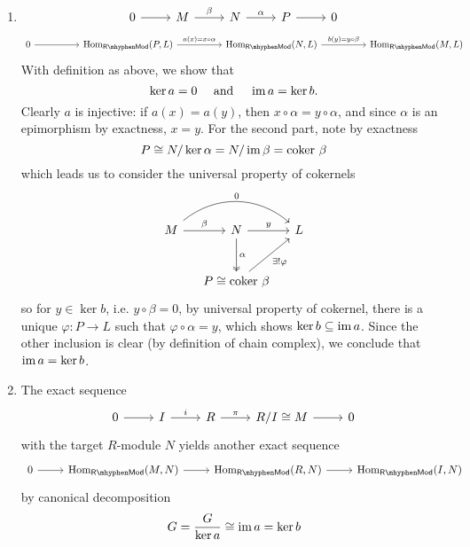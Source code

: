 \begin{pf}
\begin{enumerate}[label=(\roman*)]
    \setlength\itemsep{0pt}
    \item     
    \[
    \begin{tikzcd}
    0 \arrow[r] &M \arrow[r, "\beta"] &N \arrow[r, "\alpha"] &P \arrow[r] &0
    \end{tikzcd} 
    \]
    \[
    \begin{tikzcd}[column sep=huge]
    0 \arrow[r] &\Hom_\mathsf{R\mhyphen Mod}(P,L) \arrow[r, "a(x) = x \circ \alpha"] &\Hom_\mathsf{R\mhyphen Mod}(N,L) \arrow[r, "b(y) = y \circ \beta"] &\Hom_\mathsf{R\mhyphen Mod}(M,L)
    \end{tikzcd}	
    \]
    With definition as above, we show that 
    \[
    \ker a = 0 \quad \text{ and } \quad \operatorname{im} a = \ker b.
    \]
    Clearly $a$ is injective: if $a(x) = a(y)$, then $x \circ \alpha = y \circ \alpha$, and since $\alpha$ is an epimorphism by exactness, $x = y$. For the second part, note by exactness
    \[
    P \cong N/\ker\alpha = N/\operatorname{im}\beta = \text{coker }\beta	
    \]
    which leads us to consider the universal property of cokernels
    \[
    \begin{tikzcd}[column sep=small, row sep=large]
    M \arrow[rr, "0", bend left=40] \arrow[r, "\beta"] & N \arrow[d, "\alpha", two heads] \arrow[r, "y"]                     & L \\
    & P \cong \text{coker }\beta \arrow[ru, "\exists!\varphi"'] &  
    \end{tikzcd}	
    \]
    so for $y \in \ker b$, i.e. $y \circ \beta = 0$, by universal property of cokernel, there is a unique $\varphi: P \to L$ such that $\varphi \circ \alpha = y$, which shows $\ker b \subseteq \operatorname{im} a$. Since the other inclusion is clear (by definition of chain complex), we conclude that $\operatorname{im} a = \ker b$.
    \item The exact sequence
    \[
    \begin{tikzcd}
    0 \arrow[r] & I \arrow[r, "i"] & R \arrow[r, "\pi"] & R/I \cong M \arrow[r] &0
    \end{tikzcd}	
    \]
    with the target $R$-module $N$ yields another exact sequence
    \[
    \begin{tikzcd}
    0 \arrow[r] &\Hom_\mathsf{R\mhyphen Mod}(M,N) \arrow[r] &\Hom_\mathsf{R\mhyphen Mod}(R,N) \arrow[r] &\Hom_\mathsf{R\mhyphen Mod}(I,N)
    \end{tikzcd}
    \]
    by canonical decomposition
    \[
    G = \frac{G}{\ker a} \cong \operatorname{im} a = \ker b
\]
\end{enumerate}
\end{pf}
